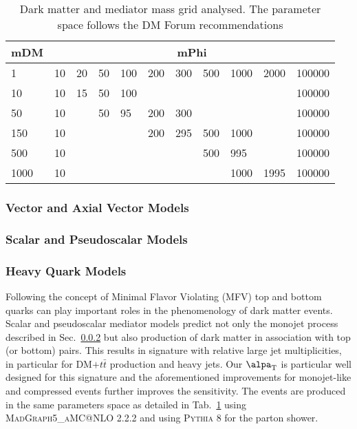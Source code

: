 \begin{table}[h]
\centering
\begin{tabular}{l|llllllllll}\hline
mDM  & \multicolumn{10}{c}{mPhi}                                   \\ \hline
1    & 10 & 20 & 50 & 100 & 200 & 300 & 500 & 1000 & 2000 & 100000 \\
10   & 10 & 15 & 50 & 100 &     &     &     &      &      & 100000 \\
50   & 10 &    & 50 & 95  & 200 & 300 &     &      &      & 100000 \\
150  & 10 &    &    &     & 200 & 295 & 500 & 1000 &      & 100000 \\
500  & 10 &    &    &     &     &     & 500 & 995  &      & 100000 \\
1000 & 10 &    &    &     &     &     &     & 1000 & 1995 & 100000\\ \hline
\end{tabular}
\caption{Dark matter and mediator mass grid analysed. The parameter space follows the DM Forum recommendations}
\label{tab:DMgrid}
\end{table}

\subsubsection{Vector and Axial Vector Models}

\subsubsection{Scalar and Pseudoscalar Models} \label{sec:dm_pscalar}

\subsubsection{Heavy Quark Models}

Following the concept of Minimal Flavor Violating (MFV) top and bottom quarks can play important roles in the phenomenology of dark matter events.
Scalar and pseudoscalar mediator models predict not only the monojet process described in Sec.~\ref{sec:dm_pscalar} but also production of dark matter in association
with top (or bottom) pairs. This results in signature with relative large jet multiplicities, in particular for DM$+t\bar{t}$ production and heavy jets. Our $\alpa_{\textrm{T}}$ is particular well designed for this signature and the aforementioned improvements for monojet-like and compressed events further improves the sensitivity. The events are produced in the same parameters space as detailed in Tab.~\ref{tab:DMgrid} using \textsc{MadGraph5\_aMC@NLO} 2.2.2 and using \textsc{Pythia 8} for the parton shower.



